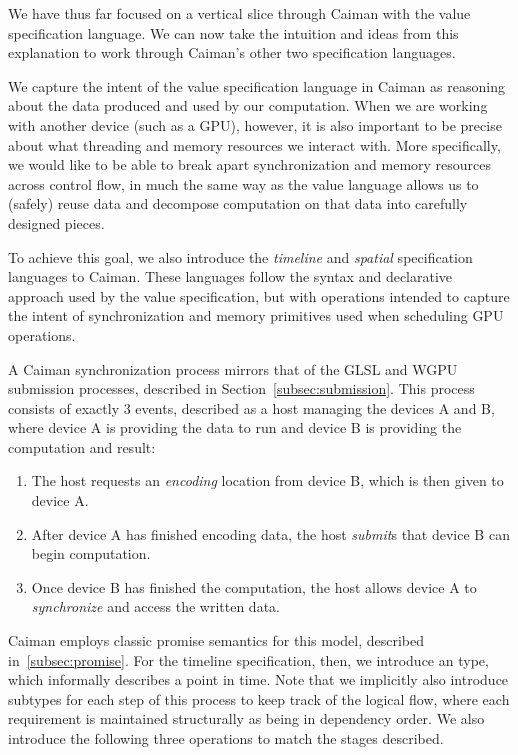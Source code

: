 We have thus far focused on a vertical slice through Caiman with the value specification language.  We can now take the intuition and ideas from this explanation to work through Caiman's other two specification languages.  

We capture the intent of the value specification language in Caiman as reasoning about the data produced and used by our computation.  When we are working with another device (such as a GPU), however, it is also important to be precise about what threading and memory resources we interact with.  More specifically, we would like to be able to break apart synchronization and memory resources across control flow, in much the same way as the value language allows us to (safely) reuse data and decompose computation on that data into carefully designed pieces.

To achieve this goal, we also introduce the \emph{timeline} and \emph{spatial} specification languages to Caiman.  These languages follow the syntax and declarative approach used by the value specification, but with operations intended to capture the intent of synchronization and memory primitives used when scheduling GPU operations.

A Caiman synchronization process mirrors that of the GLSL and WGPU submission processes, described in Section~\ref{subsec:submission}.  This process consists of exactly 3 events, described as a host managing the devices A and B, where device A is providing the data to run and device B is providing the computation and result:
%
\begin{enumerate}
\item The host requests an \emph{encoding} location from device B, which is then given to device A.
\item After device A has finished encoding data, the host \emph{submit}s that device B can begin computation.
\item Once device B has finished the computation, the host allows device A to \emph{synchronize} and access the written data.
\end{enumerate}
%
Caiman employs classic promise semantics for this model, described in~\ref{subsec:promise}.  For the timeline specification, then, we introduce an  type, which informally describes a point in time.  Note that we implicitly also introduce subtypes for each step of this process to keep track of the logical flow, where each requirement is maintained structurally as being in dependency order. We also introduce the following three operations to match the stages described.


